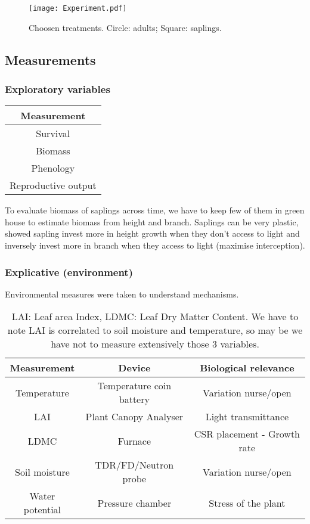 \documentclass[12pt]{article} %
\begin{document}
\begin{figure} %
\begin{center}
\texttt{[image: Experiment.pdf]}
\end{center}
\caption{Choosen treatments. Circle: adults; Square: saplings. \label{exp}}
\end{figure}


\subsection{Measurements}

\subsubsection{Exploratory variables}
\begin{table}[h]
\begin{center}
\begin{tabular}{c}
Measurement \\ 
\hline
Survival \\ 
Biomass \\ 
Phenology \\ 
Reproductive output \\
\hline 
\end{tabular}
\end{center}
\end{table} 
To evaluate biomass of saplings across time, we have to keep few of them in green house to estimate biomass from height and branch. Saplings can be very plastic, \citet{Bonser1994} showed sapling invest more in height growth when they don't access to light and inversely invest more in branch when they access to light (maximise interception). 

\subsubsection{Explicative (environment)}
Environmental measures were taken to understand mechanisms.
\begin{table}[h]
\begin{center}
\begin{tabular}{ccc}
Measurement & Device & Biological relevance\\
\hline
Temperature & Temperature coin battery & Variation nurse/open\\
LAI & Plant Canopy Analyser & Light transmittance\\
LDMC & Furnace & CSR placement - Growth rate\\
Soil moisture & TDR/FD/Neutron probe & Variation nurse/open\\
Water potential & Pressure chamber & Stress of the plant\\
\hline 
\end{tabular}
\caption{LAI: Leaf area Index, LDMC: Leaf Dry Matter Content. We have to note LAI is correlated to soil moisture and temperature, so may be we have not to measure extensively those 3 variables.}
\end{center}
\end{table}
\end{document}
